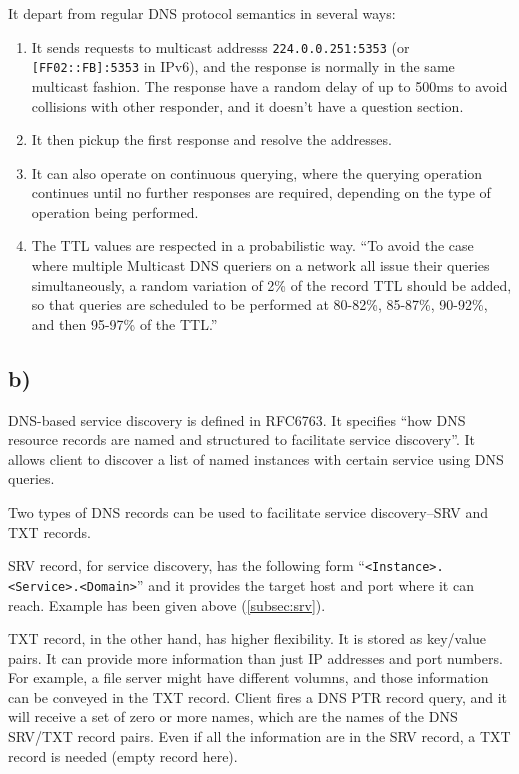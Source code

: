 \documentclass{article}
\begin{document}
It depart from regular DNS protocol semantics in several ways:
\begin{enumerate}
\item It sends requests to multicast addresss \verb+224.0.0.251:5353+ (or
  \verb+[FF02::FB]:5353+ in IPv6), and the response is normally in the same
  multicast fashion. The response have a random delay of up to 500ms to avoid
  collisions with other responder, and it doesn't have a question section.
\item
  It then pickup the first response and resolve the addresses.
\item
  It can also operate on continuous querying, where the querying operation
  continues until no further responses are required, depending on the type of
  operation being performed\autocite{RFC6762}.
\item
  The TTL values are respected in a probabilistic way. ``To avoid the case where multiple Multicast DNS queriers on a network
   all issue their queries simultaneously, a random variation of 2\% of
   the record TTL should be added, so that queries are scheduled to be
   performed at 80-82\%, 85-87\%, 90-92\%, and then 95-97\% of the TTL.''\autocite{RFC6762}
\end{enumerate}


\subsection*{b)}
DNS-based service discovery is defined in RFC6763. It specifies ``how DNS resource records are named and
   structured to facilitate service discovery''\autocite{RFC6763}. It allows
   client to discover a list of named instances with certain service using DNS
   queries.

   Two types of DNS records can be used to facilitate service discovery--SRV and
   TXT records.

   SRV record, for service discovery, has the following form
   ``\verb+<Instance>.<Service>.<Domain>+''\autocite{RFC6763} and it provides the target
   host and port where it can reach. Example has been given above
   (\autoref{subsec:srv}).

   TXT record, in the other hand, has higher flexibility. It is stored as
   key/value pairs. It can provide more
   information than just IP addresses and port numbers. For example, a file
   server might have different volumns, and those information can be conveyed in
   the TXT record. Client fires a DNS PTR record query, and it will receive a
   set of zero or more names, which are the names of the DNS SRV/TXT record
   pairs.
   Even if all the information are in the SRV record, a TXT record is needed
   (empty record here).
\printbibliography
\end{document}
